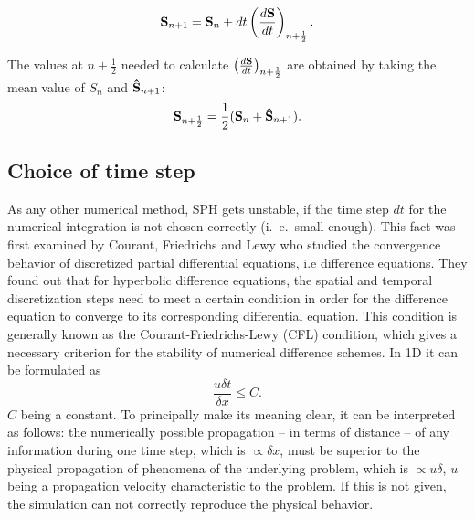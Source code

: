 \documentclass[11pt,a4paper,twoside]{report}
\begin{document}
\begin{equation}
{\bf S}_{n+1}={\bf S}_n+dt\left(\frac{d{\bf S}}{dt}\right)_{n+\frac{1}{2}}.
\end{equation}

The values at $n+\frac{1}{2}$ needed to calculate
$\left(\frac{d{\bf S}}{dt}\right)_{n+\frac{1}{2}}$ are obtained by taking the mean value of
$S_n$ and ${\bf \hat S}_{n+1}$:
\begin{equation}
{\bf S}_{n+\frac{1}{2}}=\frac{1}{2}({\bf S}_n+{\bf \hat S}_{n+1}).
\end{equation}

\subsection{Choice of time step}
\label{sec:TmeStepChoice}
As any other numerical method, SPH gets unstable, if the time step $dt$ for the numerical integration is not chosen correctly (i.\ e.\ small enough). 
This fact was first examined by Courant, Friedrichs and Lewy \cite{Courant1928} who studied the convergence behavior of discretized partial differential equations, i.e difference equations. They found out that for hyperbolic difference equations, the spatial and temporal discretization steps need to meet a certain condition in order for the difference equation to converge to its  corresponding differential equation. This condition is generally known as the Courant-Friedrichs-Lewy (CFL) condition, which gives a necessary criterion for the stability of numerical difference schemes.
In 1D it can be formulated as
\begin{equation}
 \frac{u\delta t}{\delta x}\leq C.
\end{equation}
$C$ being a constant.
To principally make its meaning clear, it can be interpreted as follows:
the numerically possible propagation -- in terms of distance -- of any information during one time step, which is $\propto\delta x$, must be superior to the physical propagation of phenomena of the underlying problem, which is $\propto u\delta$, $u$ being a propagation velocity characteristic to the problem. If this is not given, the simulation can not correctly reproduce the physical behavior. 
\end{document}

